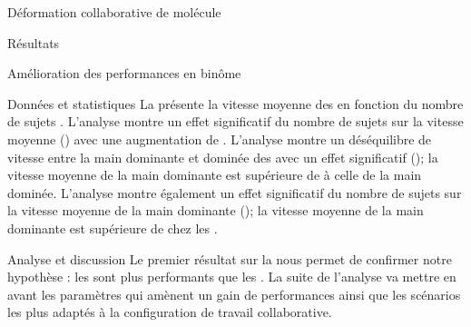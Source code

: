 \documentclass[myfrancais,ngerman,english,french]{mythesis}
\begin{document}
\begin{mychapter}{Déformation collaborative de molécule}
\begin{mysection}{Résultats}
\begin{mysubsection}{Amélioration des performances en binôme}
\begin{mysubsubsection}{Données et statistiques}
					La  présente la vitesse moyenne des   en fonction du nombre de sujets .
					L'analyse montre un effet significatif du nombre de sujets  sur la vitesse moyenne  () avec une augmentation de .
					L'analyse montre un déséquilibre de vitesse entre la main dominante et dominée des  avec un effet significatif (); la vitesse moyenne de la main dominante est supérieure de  à celle de la main dominée.
					L'analyse montre également un effet significatif du nombre de sujets  sur la vitesse moyenne  de la main dominante (); la vitesse moyenne de la main dominante est supérieure de  chez les .
				\end{mysubsubsection}
				\begin{mysubsubsection}{Analyse et discussion}
					Le premier résultat sur la  nous permet de confirmer notre hypothèse  : les  sont plus performants que les .
					La suite de l'analyse va mettre en avant les paramètres qui amènent un gain de performances ainsi que les scénarios les plus adaptés à la configuration de travail collaborative.


\end{mysubsubsection}
\end{mysubsection}
\end{mysection}
\end{mychapter}
\end{document}
